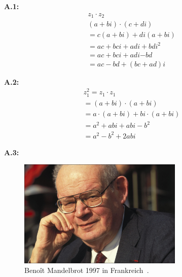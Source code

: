 \newcommand{\figuretag}[1]{%
  \addtocounter{figure}{-1}%
  \renewcommand{\thefigure}{#1}%
}
\noindent\textbf{A.1:}\label{app:1}
\begin{equation}\tag{A.1}\label{eq:complex-numbers-multiplication}
  \begin{split}
    z_1 \cdot z_2 \\
    (a + bi) \cdot (c + di) \\
    =  c(a + bi) + di(a + bi) \\
    = ac + bci + adi + bdi^2 \\
    = ac + bci + adi \boldsymbol{ - } bd \\
    = ac - bd +(bc + ad)i
  \end{split}
\end{equation}

\noindent\textbf{A.2:}\label{app:2}
\begin{equation}\tag{A.2}\label{eq:complex-numbes-squaring}
  \begin{split}
    z_1^2
    = z_1 \cdot z_1 \\
    = (a + bi) \cdot (a + bi) \\
    = a \cdot (a + bi) + bi \cdot (a + bi) \\
    = a^2 + abi + abi - b^2 \\
    = a^2 - b^2 + 2abi
  \end{split}
\end{equation}

\noindent\textbf{A.3:}\label{app:3}
\begin{figure}[H]\figuretag{A.3}\label{fig:benoit-mandelbrot-picture}
\begin{center}
  \includegraphics[width=0.7\textwidth]{images/benoit-mandelbrot}
  \caption{Benoît Mandelbrot 1997 in Frankreich~\cite{gaillarde_benoit_1997}.}
\end{center}
\end{figure}

